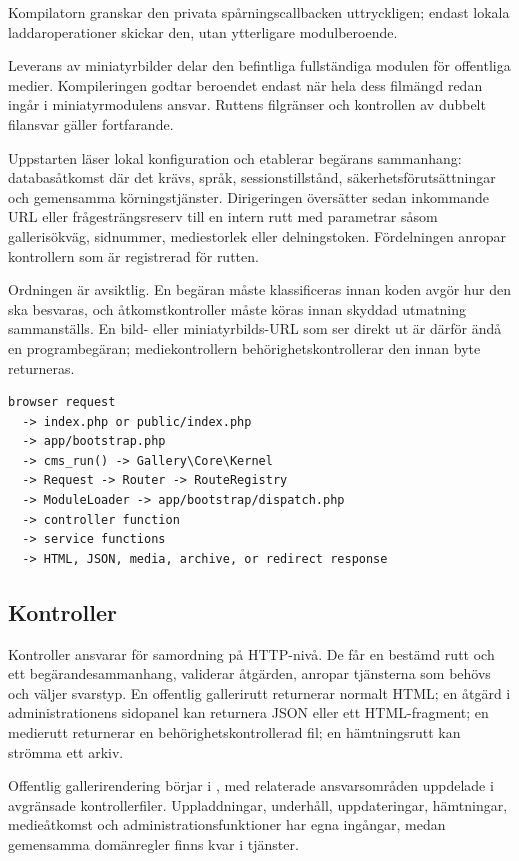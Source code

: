 \documentclass[11pt,a4paper]{article}
\newcommand{\filepath}[1]{\path{#1}}
\begin{document}
Kompilatorn granskar den privata spårningscallbacken uttryckligen; endast lokala
laddaroperationer skickar den, utan ytterligare modulberoende.

Leverans av miniatyrbilder delar den befintliga fullständiga modulen för
offentliga medier. Kompileringen godtar beroendet endast när hela dess
filmängd redan ingår i miniatyrmodulens ansvar. Ruttens filgränser och
kontrollen av dubbelt filansvar gäller fortfarande.

Uppstarten läser lokal konfiguration och etablerar begärans sammanhang:
databasåtkomst där det krävs, språk, sessionstillstånd, säkerhetsförutsättningar
och gemensamma körningstjänster. Dirigeringen översätter sedan inkommande URL
eller frågesträngsreserv till en intern rutt med parametrar såsom gallerisökväg,
sidnummer, mediestorlek eller delningstoken. Fördelningen anropar kontrollern
som är registrerad för rutten.

Ordningen är avsiktlig. En begäran måste klassificeras innan koden avgör hur den
ska besvaras, och åtkomstkontroller måste köras innan skyddad utmatning
sammanställs. En bild- eller miniatyrbilds-URL som ser direkt ut är därför ändå
en programbegäran; mediekontrollern behörighetskontrollerar den innan byte
returneras.

\begin{lstlisting}
browser request
  -> index.php or public/index.php
  -> app/bootstrap.php
  -> cms_run() -> Gallery\Core\Kernel
  -> Request -> Router -> RouteRegistry
  -> ModuleLoader -> app/bootstrap/dispatch.php
  -> controller function
  -> service functions
  -> HTML, JSON, media, archive, or redirect response
\end{lstlisting}

\subsection{Kontroller}

Kontroller ansvarar för samordning på HTTP-nivå. De får en bestämd rutt och ett
begärandesammanhang, validerar åtgärden, anropar tjänsterna som behövs och
väljer svarstyp. En offentlig gallerirutt returnerar normalt HTML; en åtgärd i
administrationens sidopanel kan returnera JSON eller ett HTML-fragment; en
medierutt returnerar en behörighetskontrollerad fil; en hämtningsrutt kan
strömma ett arkiv.

Offentlig gallerirendering börjar i
\filepath{app/controllers/public_gallery.php}, med relaterade ansvarsområden
uppdelade i avgränsade kontrollerfiler. Uppladdningar, underhåll, uppdateringar,
hämtningar, medieåtkomst och administrationsfunktioner har egna ingångar, medan
gemensamma domänregler finns kvar i tjänster.
\end{document}
